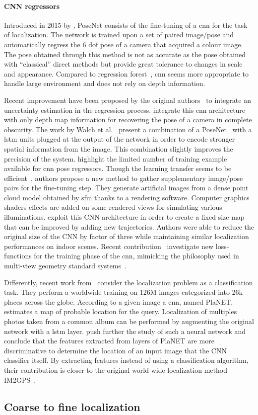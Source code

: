 \paragraph{CNN regressors}
\label{para:cnn_regressor}
Introduced in 2015 by \citet{Kendall2015}, PoseNet consists of the fine-tuning of a \ac{cnn} for the task of localization. The network is trained upon a set of paired image/pose and automatically regress the 6 \ac{dof} pose of a camera that acquired a colour image. The pose obtained through this method is not as accurate as the pose obtained with ``classical'' direct methods \citep{Feng2016a,Sattler2016a} but provide great tolerance to changes in scale and appearance. Compared to regression forest~\citep{Valentin2015}, \ac{cnn} seems more appropriate to handle large environment and does not rely on depth information.

Recent improvement have been proposed by the original authors~\citep{Kendall2016} to integrate an uncertainty estimation in the regression process. \citet{Liu2016} integrate this \ac{cnn} architecture with only depth map information for recovering the pose of a camera in complete obscurity. The work by Walch et al.~\citep{Walch2016mastersThesis,Walch2016a} present a combination of a PoseNet~\citep{Kendall2015} with a \ac{lstm} units plugged at the output of the network in order to encode stronger spatial information from the image. This combination slightly improves the precision of the system. \citet{Jia2016} highlight the limited number of training example available for \ac{cnn} pose regressors. Though the learning transfer seems to be efficient~\citep{Kendall2015}, authors propose a new method to gather supplementary image/pose pairs for the fine-tuning step. They generate artificial images from a dense point cloud model obtained by \ac{sfm} thanks to a rendering software. Computer graphics shaders effects are added on some rendered views for simulating various illuminations. \citet{Contreras2017} exploit this CNN architecture in order to create a fixed size map that can be improved by adding new trajectories. Authors were able to reduce the original size of the CNN by factor of three while maintaining similar localization performances on indoor scenes. Recent contribution~\citep{Kendall2017} investigate new loss-functions for the training phase of the \ac{cnn}, mimicking the philosophy used in multi-view geometry standard systems~\citep{Hartley2003}.

Differently, recent work from~\citet{Weyand2016} consider the localization problem as a classification task. They perform a worldwide training on 126M images categorized into 26k places across the globe. According to a given image a \ac{cnn}, named PlaNET, estimates a map of probable location for the query. Localization of multiples photos taken from a common album can be performed by augmenting the original network with a \ac{lstm} layer. \citet{Vo2017} push further the study of such a neural network and conclude that the features extracted from layers of PlaNET are more discriminative to determine the location of an input image that the CNN classifier itself. By extracting features instead of using a classification algorithm, their contribution is closer to the original world-wide localization method IM2GPS~\citep{Hays2008}.


\subsection{Coarse to fine localization}